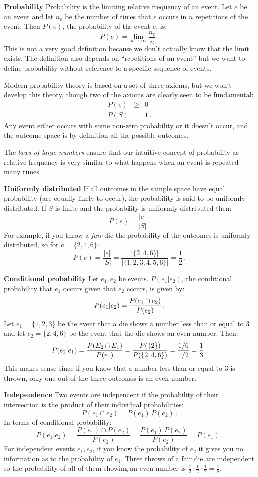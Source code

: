\textbf{Probability} Probability is the limiting relative frequency of an event. Let $e$ be an event and let $n_e$ be the number of times that $e$ occurs in $n$ repetitions of the event. Then $P(e)$, the probability of the event $e$, is:
\[
P(e) = \lim_{n\rightarrow \infty} \frac{n_e}{n}\,.
\]
This is not a very good definition because we don't actually know that the limit exists. The definition also depends on ``repetitions of an event'' but we want to define probability without reference to a specific sequence of events.

Modern probability theory is based on a set of three axioms, but we won't develop this theory, though two of the axioms are clearly seen to be fundamental:
\begin{eqnarray*}
P(e) &\geq& 0\\
P(S) &=& 1\,.
\end{eqnarray*} 
Any event either occurs with some non-zero probability or it doesn't occur, and the outcome space is by definition all the possible outcomes.

The \emph{laws of large numbers} ensure that our intuitive concept of probability as relative frequency is very similar to what happens when an event is repeated many times.

\textbf{Uniformly distributed} If all outcomes in the sample space have equal probability (are equally likely to occur), the probability is said to be uniformly distributed. If $S$ is finite and the probability is uniformly distributed then:
\[
P(e)=\frac{|e|}{|S|}\,.
\]
For example, if you throw a \emph{fair} die the probability of the outcomes is uniformly distributed, so for $e=\{2,4,6\}$:
\[
P(e) = \frac{|e|}{|S|} = \frac{|\{2,4,6\}|}{|\{1,2,3,4,5,6\}|}=\frac{1}{2}\,.
\]


\textbf{Conditional probability} Let $e_1,e_2$ be events.  $P(e_1 | e_2)$, the conditional probability that $e_1$ occurs given that $e_2$ occurs, is given by:
\[
P(e_1 | e_2) = \displaystyle\frac{P(e_1 \cap e_2)}{P(e_2)}\,.
\]
Let $e_1=\{1,2,3\}$ be the event that a die shows a number less than or equal to $3$ and let $e_2=\{2,4,6\}$ be the event that the die shows an even number. Then:
\[
P(e_2 | e_1) = \displaystyle\frac{P(E_2 \cap E_1)}{P(e_1)}=\displaystyle\frac{P(\{2\})}{P(\{2,4,6\})}= \displaystyle\frac{1/6}{1/2}=\displaystyle\frac{1}{3}\,.
\]
This makes sense since if you know that a number less than or equal to $3$ is thrown, only one out of the three outcomes is an even number.

\textbf{Independence} Two events are independent if the probability of their intersection is the product of their individual probabilities:
\[
P(e_1 \cap e_2)=P(e_1)\,P(e_2)\,.
\]
In terms of conditional probability:
\[
P(e_1 | e_2)=\frac{P(e_1)\cap P(e_2)}{P(e_2)} = \frac{P(e_1)\,P(e_2)}{P(e_2)}=P(e_1)\,. 
\]
For independent events $e_1,e_2$, if you know the probability of $e_2$ it gives you no information as to the probability of $e_1$. Three throws of a fair die are independent so the probability of all of them showing an even number is $\frac{1}{2}\cdot \frac{1}{2}\cdot \frac{1}{2}=\frac{1}{8}$. 

